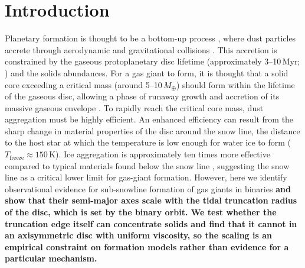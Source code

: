 \documentclass{aa}
\newcommand{\rev}[1]{{\color{red}\textbf{#1}}}
\begin{document}
   \maketitle

\section{Introduction}
\label{sec:intro}

Planetary formation is thought to be a bottom-up process
\citep{Safronov1972}, where dust particles accrete through aerodynamic
and gravitational collisions \citep{Dominik1997, Wada2009}. This
accretion is constrained by the gaseous protoplanetary disc lifetime
(approximately 3--10\,Myr; \citealt{Erc+17}) and the solids abundances.
For a gas giant to form, it is thought that a solid core exceeding a
critical mass (around 5--10\,$M_\oplus$) should form within the lifetime
of the gaseous disc, allowing a phase of runaway growth and accretion of
its massive gaseous envelope \citep{Greenberg1978, Pollack1996,
Armitage2024, Ikoma2025}. To rapidly reach the critical core mass, dust
aggregation must be highly efficient. An enhanced efficiency can result
from the sharp change in material properties of the disc around the snow
line, the distance to the host star at which the temperature is low
enough for water ice to form ($T_\mathrm{freeze} \approx 150$\,K). Ice
aggregation is approximately ten times more effective compared to typical
materials found below the snow line \citep{Blum2008, Gundlach2015},
suggesting the snow line as a critical lower limit for gas-giant
formation. However, here we identify observational evidence for
sub-snowline formation of gas giants in binaries \rev{and show that
their semi-major axes scale with the tidal truncation radius of the
disc, which is set by the binary orbit. We test whether the truncation
edge itself can concentrate solids and find that it cannot in an
axisymmetric disc with uniform viscosity, so the scaling is an empirical constraint on
formation models rather than evidence for a particular mechanism.}
\end{document}
